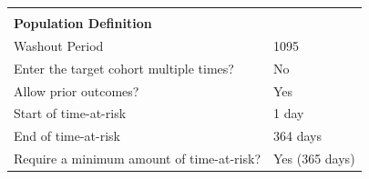 \documentclass[]{article}
\begin{document}
\begin{longtable}[]{@{}ll@{}}
\begin{minipage}[t]{0.51\columnwidth}
\strut
\end{minipage}\tabularnewline
\begin{minipage}[t]{0.42\columnwidth}\raggedright\strut
\textbf{Population Definition}\strut
\end{minipage} & \begin{minipage}[t]{0.51\columnwidth}\raggedright\strut
\strut
\end{minipage}\tabularnewline
\begin{minipage}[t]{0.42\columnwidth}\raggedright\strut
Washout Period\strut
\end{minipage} & \begin{minipage}[t]{0.51\columnwidth}\raggedright\strut
1095\strut
\end{minipage}\tabularnewline
\begin{minipage}[t]{0.42\columnwidth}\raggedright\strut
Enter the target cohort multiple times?\strut
\end{minipage} & \begin{minipage}[t]{0.51\columnwidth}\raggedright\strut
No\strut
\end{minipage}\tabularnewline
\begin{minipage}[t]{0.42\columnwidth}\raggedright\strut
Allow prior outcomes?\strut
\end{minipage} & \begin{minipage}[t]{0.51\columnwidth}\raggedright\strut
Yes\strut
\end{minipage}\tabularnewline
\begin{minipage}[t]{0.42\columnwidth}\raggedright\strut
Start of time-at-risk\strut
\end{minipage} & \begin{minipage}[t]{0.51\columnwidth}\raggedright\strut
1 day\strut
\end{minipage}\tabularnewline
\begin{minipage}[t]{0.42\columnwidth}\raggedright\strut
End of time-at-risk\strut
\end{minipage} & \begin{minipage}[t]{0.51\columnwidth}\raggedright\strut
364 days\strut
\end{minipage}\tabularnewline
\begin{minipage}[t]{0.42\columnwidth}\raggedright\strut
Require a minimum amount of time-at-risk?\strut
\end{minipage} & \begin{minipage}[t]{0.51\columnwidth}\raggedright\strut
Yes (365 days)\strut
\end{minipage}\tabularnewline

\end{longtable}
\end{document}
